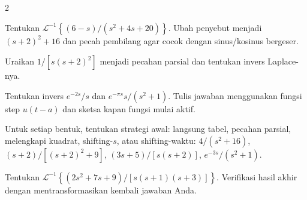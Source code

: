 \documentclass[10pt,a4paper]{article}
\newcommand{\level}[1]{\colorbox{levelbg}{\scriptsize\strut #1}}
\newcommand{\src}[1]{\colorbox{sourcebg}{\scriptsize\strut #1}}
\newcommand{\iLap}[1]{\mathcal{L}^{-1}\left\{#1\right\}}
\begin{document}
\begin{multicols}{2}
\begin{qbox}[title={M3.8: Lengkapi kuadrat\hfill \level{L3}\;\src{Boas}}]
\small Tentukan $\iLap{(6-s)/(s^2+4s+20)}$. Ubah penyebut menjadi $(s+2)^2+16$ dan pecah pembilang agar cocok dengan sinus/kosinus bergeser.
\end{qbox}
\begin{qbox}[title={M3.9: Faktor berulang\hfill \level{L3}\;\src{Var}}]
\small Uraikan $1/[s(s+2)^2]$ menjadi pecahan parsial dan tentukan invers Laplace-nya.
\end{qbox}
\begin{qbox}[title={M3.10: Shifting waktu\hfill \level{L3}\;\src{Boas}}]
\small Tentukan invers $e^{-2s}/s$ dan $e^{-\pi s}s/(s^2+1)$. Tulis jawaban menggunakan fungsi step $u(t-a)$ dan sketsa kapan fungsi mulai aktif.
\end{qbox}
\begin{qbox}[title={M3.11: Pilih strategi sebelum menghitung\hfill \level{L2}\;\src{Var}}]
\small Untuk setiap bentuk, tentukan strategi awal: langsung tabel, pecahan parsial, melengkapi kuadrat, shifting-$s$, atau shifting-waktu: $4/(s^2+16)$, $(s+2)/[(s+2)^2+9]$, $(3s+5)/[s(s+2)]$, $e^{-3s}/(s^2+1)$.
\end{qbox}
\begin{qbox}[title={M3.12: Inverse transform campuran\hfill \level{L4}\;\src{Var}}]
\small Tentukan $\iLap{(2s^2+7s+9)/[s(s+1)(s+3)]}$. Verifikasi hasil akhir dengan mentransformasikan kembali jawaban Anda.
\end{qbox}
\end{multicols}
\newpage
\end{document}
